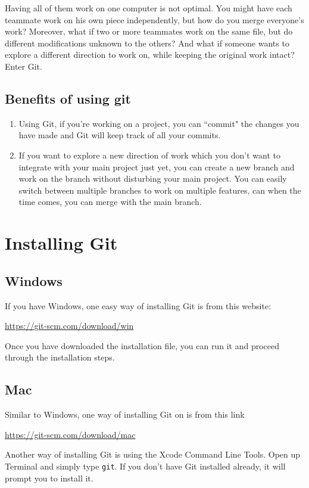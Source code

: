 \documentclass[12pt]{report}
\begin{document}
Having all of them work on one computer is not optimal. You might have each teammate work on his own piece independently, but how do you merge everyone's work? Moreover, what if two or more teammates work on the same file, but do different modifications unknown to the others? And what if someone wants to explore a different direction to work on, while keeping the original work intact? Enter Git.

\section{Benefits of using git}
\begin{enumerate}
  \item Using Git, if you're working on a project, you can ``commit" the changes you have made and Git will keep track of all your commits. 
  
  \item If you want to explore a new direction of work which you don't want to integrate with your main project just yet, you can create a new branch and work on the branch without disturbing your main project. You can easily switch between multiple branches to work on multiple features, can when the time comes, you can merge with the main branch. 
\end{enumerate}

\chapter{Installing Git}

\section{Windows}
If you have Windows, one easy way of installing Git is from this website:

\url{https://git-scm.com/download/win}

\noindent
Once you have downloaded the installation file, you can run it and proceed through the installation steps.

\section{Mac}

Similar to Windows, one way of installing Git on is from this link

\url{https://git-scm.com/download/mac}


\noindent
Another way of installing Git is using the Xcode Command Line Tools. Open up Terminal 
and simply type \verb|git|. If you don’t have Git installed already, it will prompt you to install it.
\end{document}
